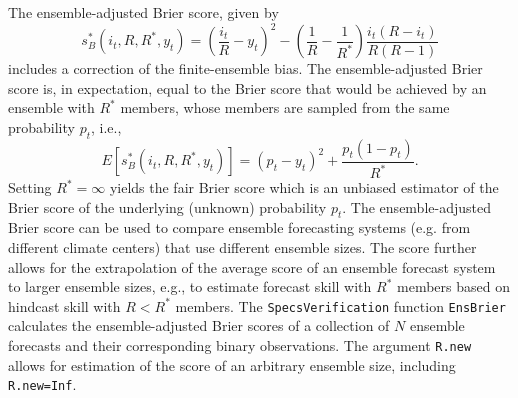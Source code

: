 \documentclass[10pt]{article}\usepackage[]{graphicx}\usepackage[]{color}
\newcommand{\pkg}[1]{\texttt{#1}}
\newcommand{\code}[1]{\texttt{#1}}
\begin{document}
The ensemble-adjusted Brier score, given by \citep{ferro2008effect}
%
\begin{equation}
s_{B}^*(i_t, R, R^*, y_t) = \left(\frac{i_t}{R} - y_t\right)^2 - \left(\frac{1}{R} - \frac{1}{R^*}\right)\frac{i_t(R-i_t)}{R(R-1)}
\label{eq:ens-brier}
\end{equation}
%
includes a correction of the finite-ensemble bias.
The ensemble-adjusted Brier score is, in expectation, equal to the Brier score that would be achieved by an ensemble with $R^*$ members, whose members are sampled from the same probability $p_t$, i.e., 
%
\begin{equation}
E\left[s_{B}^*(i_t, R, R^*, y_t)\right] = (p_t - y_t)^2 + \frac{p_t(1-p_t)}{R^*}.
\end{equation}
%
Setting $R^*=\infty$ yields the fair Brier score \citep{ferro2013fair} which is an unbiased estimator of the Brier score of the underlying (unknown) probability $p_t$.
The ensemble-adjusted Brier score can be used to compare ensemble forecasting systems (e.g. from different climate centers) that use different ensemble sizes.
The score further allows for the extrapolation of the average score of an ensemble forecast system to larger ensemble sizes, e.g., to estimate forecast skill with $R^*$ members based on hindcast skill with $R<R^*$ members.
The \pkg{SpecsVerification} function \code{EnsBrier} calculates the ensemble-adjusted Brier scores of a collection of $N$ ensemble forecasts and their corresponding binary observations. 
The argument \code{R.new} allows for estimation of the score of an arbitrary ensemble size, including \code{R.new=Inf}.
\end{document}
